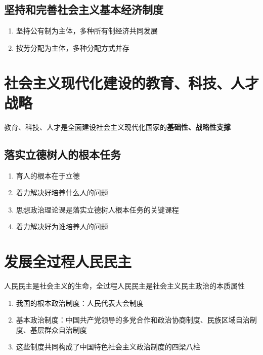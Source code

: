 \documentclass{ctexart}
\numberwithin{figure}{section}
\numberwithin{equation}{section}
\begin{document}
    \subsection{坚持和完善社会主义基本经济制度}
        \begin{enumerate}
            \item 坚持公有制为主体，多种所有制经济共同发展
            \item 按劳分配为主体，多种分配方式并存
        \end{enumerate}
\section{社会主义现代化建设的教育、科技、人才战略}
教育、科技、人才是全面建设社会主义现代化国家的\textbf{基础性、战略性支撑}
    \subsection{落实立德树人的根本任务}
        \begin{enumerate}
            \item 育人的根本在于立德
            \item 着力解决好培养什么人的问题
            \item  思想政治理论课是落实立德树人根本任务的关键课程
            \item 着力解决好为谁培养人的问题
        \end{enumerate}
\section{发展全过程人民民主}
        人民民主是社会主义的生命，全过程人民民主是社会主义民主政治的本质属性
        \begin{enumerate}
            \item 我国的根本政治制度：人民代表大会制度
            \item 基本政治制度：中国共产党领导的多党合作和政治协商制度、民族区域自治制度、基层群众自治制度
            \item 这些制度共同构成了中国特色社会主义政治制度的四梁八柱
        \end{enumerate}
\end{document}
